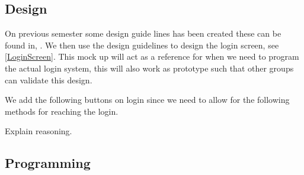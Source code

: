 \subsection{Design}

On previous semester some design guide lines has been created these can be
found in, . We then use the design
guidelines to design the login screen, see \autoref{LoginScreen}. This mock up
will act as a reference for when we need to program the actual login system,
this will also work as prototype such that other groups can validate this
design. 

We add the following buttons on login since we need to allow for the
following methods for reaching the login.


Explain reasoning.

\subsection{Programming}



